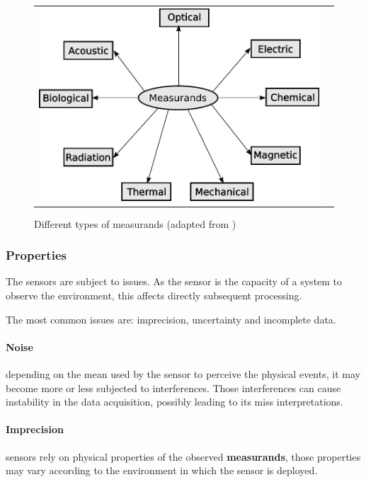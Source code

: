 \begin{figure}[h]
   \centering
     \begin{tabular}{lr}
       \includegraphics[scale=0.70]{img/fig:sensors}
     \end{tabular}
   \caption{Different types of measurands (adapted from \cite{WhiteRichard})}
   \label{fig:sensors}
 \end{figure}

\subsubsection{Properties}

The sensors are subject to issues. As the sensor is the capacity of a system to observe the environment, this affects directly subsequent processing.

The most common issues are: imprecision, uncertainty and incomplete data. 

\paragraph{Noise} depending on the mean used by the sensor to perceive the physical events, it may become more or less subjected to interferences. Those interferences can cause instability in the data acquisition, possibly leading to its miss interpretations.

\paragraph{Imprecision} sensors rely on physical properties of the observed \textbf{measurands}, those properties may vary according to the environment in which the sensor is deployed.

